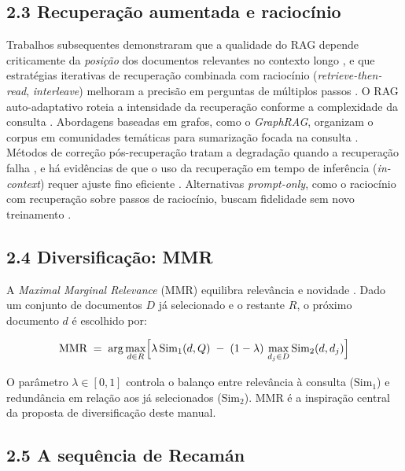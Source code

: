 \documentclass[
	article,
	11pt,
	oneside,
	a4paper,
	english,
	brazil,
	sumario=tradicional
	]{abntex2}
\begin{document}
\subsection*{2.3 Recuperação aumentada e raciocínio}

Trabalhos subsequentes demonstraram que a qualidade do RAG depende criticamente
da \emph{posição} dos documentos relevantes no contexto longo
\cite{Liu2024LostMiddle}, e que estratégias iterativas de recuperação combinada
com raciocínio (\emph{retrieve-then-read}, \emph{interleave}) melhoram a
precisão em perguntas de múltiplos passos \cite{IzacardGrave2021LeveragingPassages,
Trivedi2023Interleaving}. O RAG auto-adaptativo roteia a intensidade da
recuperação conforme a complexidade da consulta \cite{Jeong2024AdaptiveRAG}.
Abordagens baseadas em grafos, como o \emph{GraphRAG}, organizam o corpus em
comunidades temáticas para sumarização focada na consulta
\cite{Edge2024GraphRAG}. Métodos de correção pós-recuperação tratam a degradação
quando a recuperação falha \cite{Yan2024CRAG}, e há evidências de que o uso da
recuperação em tempo de inferência (\emph{in-context}) requer ajuste fino
eficiente \cite{Ram2023RetrievalAugmented}. Alternativas \emph{prompt-only}, como
o raciocínio com recuperação sobre passos de raciocínio, buscam fidelidade sem
novo treinamento \cite{He2023RethinkingRetrieval}.

\subsection*{2.4 Diversificação: MMR}

A \emph{Maximal Marginal Relevance} (MMR) equilibra relevância e novidade
\cite{CarbonellGoldstein1998MMR}. Dado um conjunto de documentos $D$ já
selecionado e o restante $R$, o próximo documento $d$ é escolhido por:

\begin{equation}
\label{eq:mmr}
\text{MMR} \;=\; \arg\max_{d \in R}\Bigl[
\lambda\,\text{Sim}_1(d,Q)\;-\;(1-\lambda)\,
\max_{d_j \in D}\text{Sim}_2(d,d_j)
\Bigr]
\end{equation}

O parâmetro $\lambda \in [0,1]$ controla o balanço entre relevância à consulta
($\text{Sim}_1$) e redundância em relação aos já selecionados ($\text{Sim}_2$).
MMR é a inspiração central da proposta de diversificação deste manual.

\subsection*{2.5 A sequência de Recamán}
\end{document}
